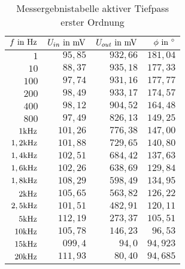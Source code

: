 \begin{table}[H]
\centering
\caption{Messergebnistabelle aktiver Tiefpass erster Ordnung}
\label{tab:TP_erg_tab}
\begin{tabular}{|r|r|r|r|}
\hline
\rowcolor[HTML]{C0C0C0} 
$f\text{ in }\text{Hz}$       & $U_{in}\text{ in }\text{mV}$    & $U_{out}\text{ in }\text{mV}$   & $\phi\text{ in }^\circ$        \\ \hline
$1     $&$ 95,85  $&$ 932,66  $&$ 181,04 $\\ \hline
$10    $&$ 88,37  $&$ 935,18  $&$ 177,33 $\\ \hline
$100   $&$ 97,74  $&$ 931,16  $&$ 177,77 $\\ \hline
$200   $&$ 98,49  $&$ 933,17  $&$ 174,57 $\\ \hline
$400   $&$ 98,12  $&$ 904,52  $&$ 164,48 $\\ \hline
$800   $&$ 97,49  $&$ 826,13  $&$ 149,25 $\\ \hline
$1\text{kHz}   $&$ 101,26 $&$ 776,38  $&$ 147,00 $\\ \hline
$1,2\text{kHz} $&$ 101,88 $&$ 729,65  $&$ 140,80 $\\ \hline
$1,4\text{kHz} $&$ 102,51 $&$ 684,42  $&$ 137,63 $\\ \hline
$1,6\text{kHz} $&$ 102,26 $&$ 638,69  $&$ 129,84 $\\ \hline
$1,8\text{kHz} $&$ 108,29 $&$ 598,49  $&$ 134,95 $\\ \hline
$2\text{kHz}   $&$ 105,65 $&$ 563,82  $&$ 126,22 $\\ \hline
$2,5\text{kHz} $&$ 101,51 $&$ 482,91  $&$ 120,11 $\\ \hline
$5\text{kHz}   $&$ 112,19 $&$ 273,37  $&$ 105,51 $\\ \hline
$10\text{kHz}  $&$ 105,78 $&$ 146,23  $&$ 96,53  $\\ \hline
$15\text{kHz}  $&$ 099,4  $&$ 94,0    $&$ 94,923 $\\ \hline
$20\text{kHz}  $&$ 111,93 $&$ 80,40   $&$ 94,685 $\\ \hline
\end{tabular}
\end{table}